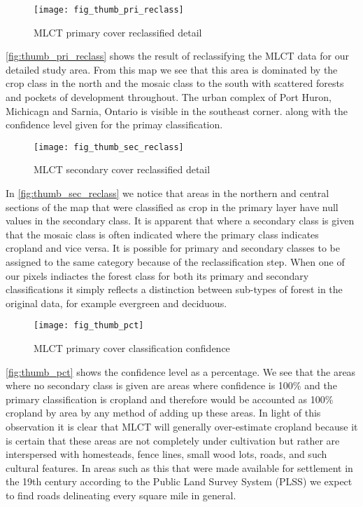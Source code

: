 \begin{figure}[hpt] 
  \centering
  

\texttt{[image: fig\_thumb\_pri\_reclass]}
\caption{MLCT primary cover reclassified detail} 
\label{fig:thumb_pri_reclass} 
\end{figure} 


\autoref{fig:thumb_pri_reclass} shows the result of reclassifying the MLCT data
for our detailed study area.  From this map we see that this area is
dominated by the crop class in the north and the mosaic class to the
south with scattered forests and pockets of development throughout.
The urban complex of Port Huron, Michicagn and Sarnia, Ontario is
visible in the southeast corner.  along with the confidence level given for
the primay classification.

\begin{figure}[hpt] 
\begin{center}
  

\texttt{[image: fig\_thumb\_sec\_reclass]}
\end{center} 
\caption{MLCT secondary cover reclassified detail} 
\label{fig:thumb_sec_reclass} 
\end{figure} 


In \autoref{fig:thumb_sec_reclass} we notice that areas in the
northern and central sections of the map that were classified as crop
in the primary layer have null values in the secondary class.  It is
apparent that where a secondary class is given that the mosaic class
is often indicated where the primary class indicates cropland and vice
versa.  It is possible for primary and secondary classes to be
assigned to the same category because of the reclassification step.
When one of our pixels indiactes the forest class for both its primary
and secondary classifications it simply reflects a distinction between
sub-types of forest in the original data, for example evergreen and
deciduous.

\begin{figure}[hpt] 
\begin{center}
  

\texttt{[image: fig\_thumb\_pct]}
\end{center} 
\caption{MLCT primary cover classification confidence} 
\label{fig:thumb_pct} 
\end{figure} 

\autoref{fig:thumb_pct} shows the confidence level as a percentage.
We see that the areas where no secondary class is given are areas
where confidence is 100\% and the primary classification is cropland
and therefore would be accounted as 100\% cropland by area by any
method of adding up these areas.  In light of this observation it is
clear that MLCT will generally over-estimate cropland because it is
certain that these areas are not completely under cultivation but
rather are interspersed with homesteads, fence lines, small wood lots,
roads, and such cultural features.  In areas such as this that were
made available for settlement in the 19th century according to the
Public Land Survey System (PLSS) we expect to find roads delineating
every square mile in general.  

